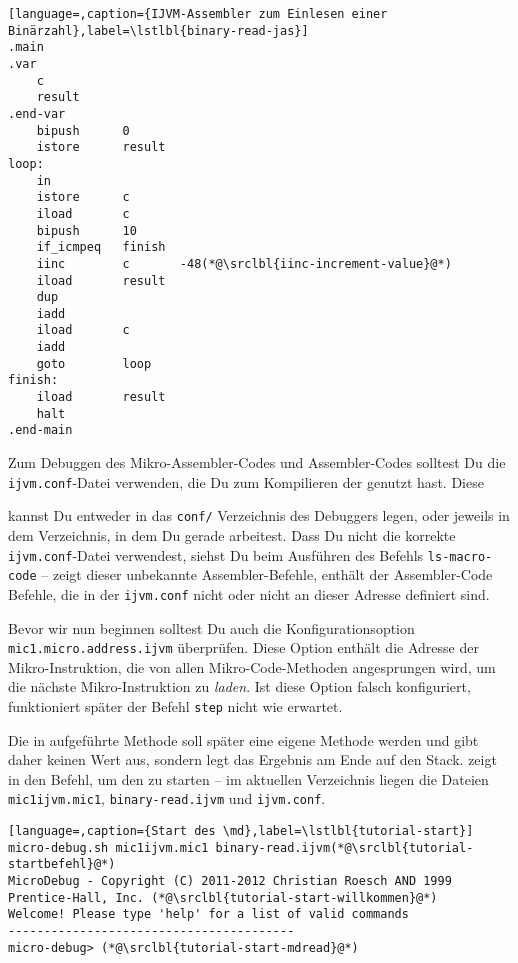 \begin{lstlisting}[language=,caption={IJVM-Assembler zum Einlesen einer Binärzahl},label=\lstlbl{binary-read-jas}]
.main
.var
    c
    result
.end-var
    bipush      0
    istore      result
loop:
    in
    istore      c
    iload       c
    bipush      10
    if_icmpeq   finish
    iinc        c       -48(*@\srclbl{iinc-increment-value}@*)
    iload       result
    dup
    iadd
    iload       c
    iadd
    goto        loop
finish:
    iload       result
    halt
.end-main
\end{lstlisting}

Zum Debuggen des Mikro-Assembler-Codes und Assembler-Codes solltest Du die \texttt{ijvm.conf}-Datei verwenden, die Du zum Kompilieren der  genutzt hast. Diese \date{conf} kannst Du entweder in das \texttt{conf/} Verzeichnis des Debuggers legen, oder jeweils in dem Verzeichnis, in dem Du gerade arbeitest. Dass Du nicht die korrekte \texttt{ijvm.conf}-Datei verwendest, siehst Du beim Ausführen des Befehls \texttt{ls-macro-code} -- zeigt dieser unbekannte Assembler-Befehle, enthält der Assembler-Code Befehle, die in der \texttt{ijvm.conf} nicht oder nicht an dieser Adresse definiert sind.

Bevor wir nun beginnen solltest Du auch die Konfigurationsoption \texttt{mic1.micro.address.ijvm} überprüfen. Diese Option enthält die Adresse der Mikro-Instruktion, die von allen Mikro-Code-Methoden angesprungen wird, um die nächste Mikro-Instruktion zu \emph{laden}. Ist diese Option falsch konfiguriert, funktioniert später der Befehl \texttt{step} nicht wie erwartet.

Die in  aufgeführte Methode soll später eine eigene Methode werden und gibt daher keinen Wert aus, sondern legt das Ergebnis am Ende auf den Stack.  zeigt in  den Befehl, um den \md zu starten -- im aktuellen Verzeichnis liegen die Dateien \texttt{mic1ijvm.mic1}, \texttt{binary-read.ijvm} und \texttt{ijvm.conf}.

\begin{lstlisting}[language=,caption={Start des \md},label=\lstlbl{tutorial-start}]
micro-debug.sh mic1ijvm.mic1 binary-read.ijvm(*@\srclbl{tutorial-startbefehl}@*)
MicroDebug - Copyright (C) 2011-2012 Christian Roesch AND 1999 Prentice-Hall, Inc. (*@\srclbl{tutorial-start-willkommen}@*)
Welcome! Please type 'help' for a list of valid commands
----------------------------------------
micro-debug> (*@\srclbl{tutorial-start-mdread}@*)
\end{lstlisting}

